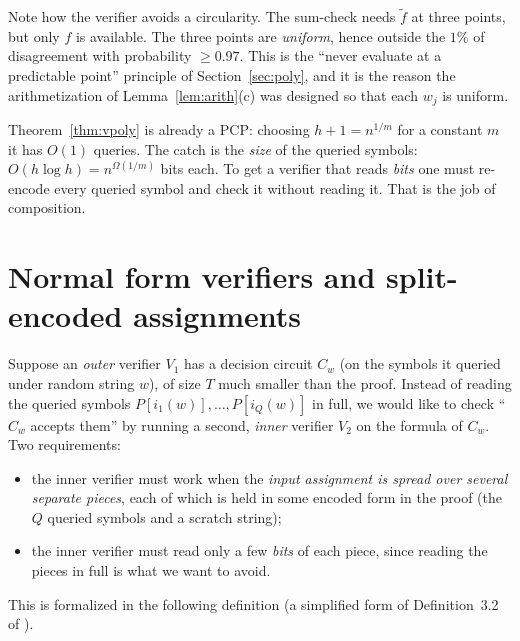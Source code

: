 \begin{remark}
Note how the verifier avoids a circularity.  The sum-check needs $\tilde f$ at three points, but only $f$ is available.  The three points are \emph{uniform}, hence outside the $1\%$ of disagreement with probability $\ge0.97$.
This is the ``never evaluate at a predictable point'' principle of Section~\ref{sec:poly}, and it is the reason the arithmetization of Lemma~\ref{lem:arith}(c) was designed so that each $w_j$ is uniform.
\end{remark}

Theorem~\ref{thm:vpoly} is already a PCP: choosing $h+1=n^{1/m}$ for a constant $m$ it has $O(1)$ queries.  The catch is the \emph{size} of the queried symbols: $O(h\log h)=n^{\Omega(1/m)}$ bits each.
To get a verifier that reads \emph{bits} one must re-encode every queried symbol and check it without reading it.  That is the job of composition.


\section{Normal form verifiers and split-encoded assignments}
\label{sec:normal}

Suppose an \emph{outer} verifier $V_1$ has a decision circuit $C_w$ (on the symbols it queried under random string $w$), of size $T$ much smaller than the proof.
Instead of reading the queried symbols $P[i_1(w)],\dots,P[i_Q(w)]$ in full, we would like to check ``$C_w$ accepts them'' by running a second, \emph{inner} verifier $V_2$ on the formula of $C_w$.
Two requirements:
\begin{itemize}
  \item the inner verifier must work when the \emph{input assignment is spread over several separate pieces}, each of which is held in some encoded form in the proof (the $Q$ queried symbols and a scratch string);
  \item the inner verifier must read only a few \emph{bits} of each piece, since reading the pieces in full is what we want to avoid.
\end{itemize}
This is formalized in the following definition (a simplified form of Definition~3.2 of \citet{AroraSafra98}).

